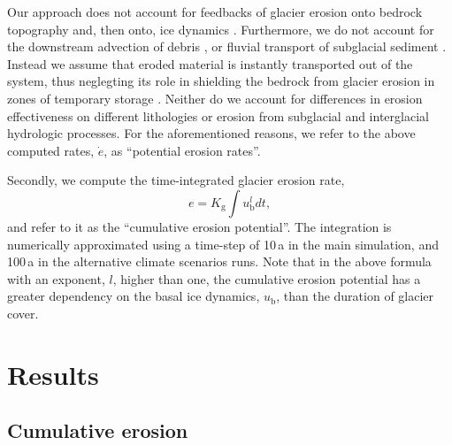 \documentclass[esurf, manuscript]{copernicus}
\begin{document}
    Our approach does not account for feedbacks of glacier erosion onto
    bedrock topography and, then onto, ice dynamics
    \citep[e.g.,][]{Anderson.etal.2012}. Furthermore, we do not account for the
    downstream advection of debris \citep[e.g.,][]{Anderson.Anderson.2016},
    or fluvial transport of subglacial sediment \citep{Delaney.etal.2019}.
    Instead we assume that eroded material is instantly transported out of the
    system, thus neglegting its role in shielding the bedrock from glacier
    erosion in zones of temporary storage \citep{Preusser.etal.2010}. Neither
    do we account for differences in erosion effectiveness on different
    lithologies or erosion from subglacial and interglacial hydrologic
    processes. For the aforementioned reasons, we refer to the above computed
    rates, $\dot{e}$, as ``potential erosion rates''.

    Secondly, we compute the time-integrated glacier erosion rate,
    \begin{equation}
        e =  K_\mathrm{g} \int u_\mathrm{b}^l dt,
    \end{equation}
    and refer to it as the ``cumulative erosion potential''. The integration
    is numerically approximated using a time-step of 10\,a in the
    main simulation, and 100\,a in the alternative climate scenarios runs.
    Note that in the above formula with an exponent, $l$,
    higher than one, the cumulative erosion potential has a greater dependency
    on the basal ice dynamics, $u_\mathrm{b}$, than the duration of glacier
    cover.


\section{Results}

\subsection{Cumulative erosion}
\end{document}
